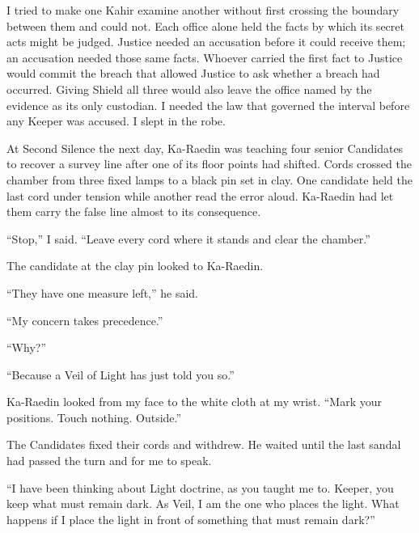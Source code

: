 I tried to make one Kahir examine another without first crossing the boundary between them and could not. Each office alone held the facts by which its secret acts might be judged. Justice needed an accusation before it could receive them; an accusation needed those same facts. Whoever carried the first fact to Justice would commit the breach that allowed Justice to ask whether a breach had occurred. Giving Shield all three would also leave the office named by the evidence as its only custodian. I needed the law that governed the interval before any Keeper was accused. I slept in the robe.\par

At Second Silence the next day, Ka-Raedin was teaching four senior Candidates to recover a survey line after one of its floor points had shifted. Cords crossed the chamber from three fixed lamps to a black pin set in clay. One candidate held the last cord under tension while another read the error aloud. Ka-Raedin had let them carry the false line almost to its consequence.\par

``Stop,'' I said. ``Leave every cord where it stands and clear the chamber.''\par

The candidate at the clay pin looked to Ka-Raedin.\par

``They have one measure left,'' he said.\par

``My concern takes precedence.''\par

``Why?''\par

``Because a Veil of Light has just told you so.''\par

Ka-Raedin looked from my face to the white cloth at my wrist. ``Mark your positions. Touch nothing. Outside.''\par

The Candidates fixed their cords and withdrew. He waited until the last sandal had passed the turn and for me to speak.\par

``I have been thinking about Light doctrine, as you taught me to. Keeper, you keep what must remain dark. As Veil, I am the one who places the light. What happens if I place the light in front of something that must remain dark?''\par

